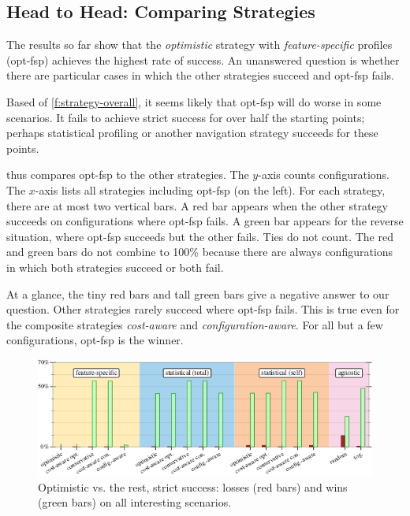 \subsection{Head to Head: Comparing Strategies}
\label{s:hh}

The results so far show that the \emph{optimistic} strategy
with \emph{feature-specific} profiles (opt-fsp) achieves the highest rate
of success.
An unanswered question is whether there are particular cases in which
the other strategies succeed and opt-fsp fails.

Based of \cref{f:strategy-overall}, it seems likely that opt-fsp will do
worse in some scenarios.
It fails to achieve strict success for over half the starting points;
perhaps statistical profiling or another navigation strategy succeeds
for these points.

 thus compares opt-fsp to the other strategies.
The $y$-axis counts configurations.
The $x$-axis lists all strategies including opt-fsp (on the left).
For each strategy, there are at most two vertical bars.
A red bar appears when the other strategy succeeds on configurations
where opt-fsp fails.
A green bar appears for the reverse situation, where opt-fsp succeeds
but the other fails.
Ties do not count.
The red and green bars do not combine to 100\% because there are always configurations
in which both strategies succeed or both fail.

At a glance, the tiny red bars and tall green bars give a negative answer to our question.
Other strategies rarely succeed where opt-fsp fails.
This is true even for the composite strategies \emph{cost-aware} and \emph{configuration-aware}.
For all but a few configurations, opt-fsp is the winner.

\begin{figure}[t]
  \includegraphics[width=0.9\columnwidth]{data/head-to-head.pdf}
  \caption{Optimistic vs. the rest, strict success: losses (red bars) and wins (green bars) on all interesting scenarios.}
  \label{f:head-to-head}
\end{figure}


